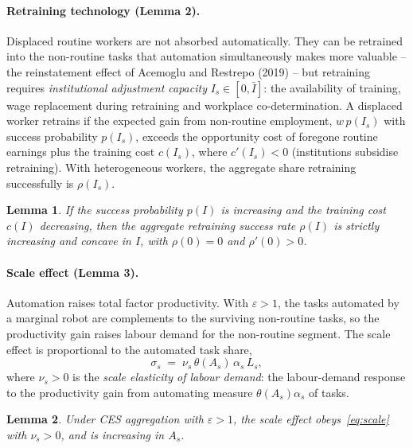 \documentclass[12pt]{article}
\newtheorem{lemma}{Lemma}
\begin{document}
\paragraph{Retraining technology (Lemma 2).} Displaced routine workers are not absorbed automatically. They can be retrained into the non-routine tasks that automation simultaneously makes more valuable -- the reinstatement effect of Acemoglu and Restrepo (2019) -- but retraining requires \emph{institutional adjustment capacity} $I_s\in[0,\bar I]$: the availability of training, wage replacement during retraining and workplace co-determination. A displaced worker retrains if the expected gain from non-routine employment, $w\,p(I_s)$ with success probability $p(I_s)$, exceeds the opportunity cost of foregone routine earnings plus the training cost $c(I_s)$, where $c'(I_s)<0$ (institutions subsidise retraining). With heterogeneous workers, the aggregate share retraining successfully is $\rho(I_s)$.

\begin{lemma}\label{lem:rho}
If the success probability $p(I)$ is increasing and the training cost $c(I)$ decreasing, then the aggregate retraining success rate $\rho(I)$ is strictly increasing and concave in $I$, with $\rho(0)=0$ and $\rho'(0)>0$.
\end{lemma}


\paragraph{Scale effect (Lemma 3).} Automation raises total factor productivity. With $\varepsilon>1$, the tasks automated by a marginal robot are complements to the surviving non-routine tasks, so the productivity gain raises labour demand for the non-routine segment. The scale effect is proportional to the automated task share,
\begin{equation}
\sigma_s \;=\; \nu_s\,\theta(A_s)\,\alpha_s\,L_s,
\label{eq:scale}
\end{equation}
where $\nu_s>0$ is the \emph{scale elasticity of labour demand}: the labour-demand response to the productivity gain from automating measure $\theta(A_s)\alpha_s$ of tasks.

\begin{lemma}\label{lem:sigma}
Under CES aggregation with $\varepsilon>1$, the scale effect obeys~\eqref{eq:scale} with $\nu_s>0$, and is increasing in $A_s$.
\end{lemma}
\end{document}
